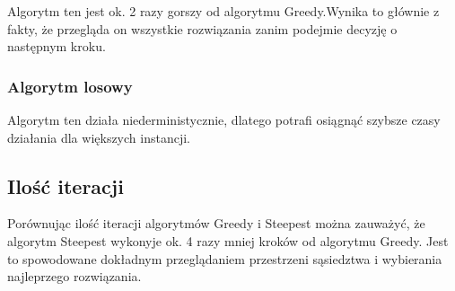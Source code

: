 Algorytm ten jest ok. 2 razy gorszy od algorytmu Greedy.Wynika to głównie z fakty, że przegląda on
wszystkie rozwiązania zanim podejmie decyzję o następnym kroku. 

\subsubsection{Algorytm losowy}

Algorytm ten działa niederministycznie, dlatego potrafi osiągnąć szybsze czasy działania dla 
większych instancji. 

\subsection{Ilość iteracji}

Porównując ilość iteracji algorytmów Greedy i Steepest można zauważyć, że algorytm 
Steepest wykonyje ok. 4 razy mniej kroków od algorytmu Greedy. Jest to spowodowane 
dokładnym przeglądaniem przestrzeni sąsiedztwa i wybierania najleprzego rozwiązania.
